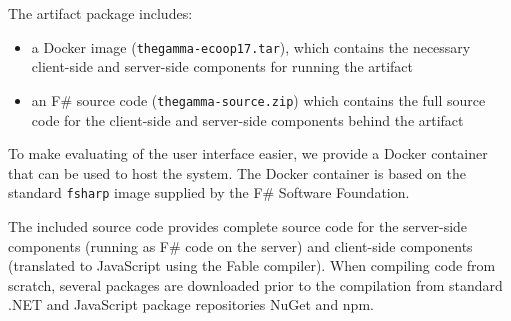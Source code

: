\documentclass[a4paper,UKenglish]{darts}
\begin{document}
\begin{content}
The artifact package includes:
\begin{itemize}
\item a Docker image ({\tt thegamma-ecoop17.tar}), which contains the necessary client-side
  and server-side components for running the artifact
\item an F\# source code ({\tt thegamma-source.zip}) which contains the full source code for 
  the client-side and server-side components behind the artifact
\end{itemize}
To make evaluating of the user interface easier, we provide a Docker container that
can be used to host the system. The Docker container is based on the standard {\tt fsharp} 
image supplied by the F\# Software Foundation. 

The included source code provides complete source code
for the server-side components (running as F\# code on the server) and client-side components
(translated to JavaScript using the Fable compiler). When compiling code from scratch, several
packages are downloaded prior to the compilation from standard .NET and JavaScript package
repositories NuGet and npm.
\end{content} 
\end{document}
